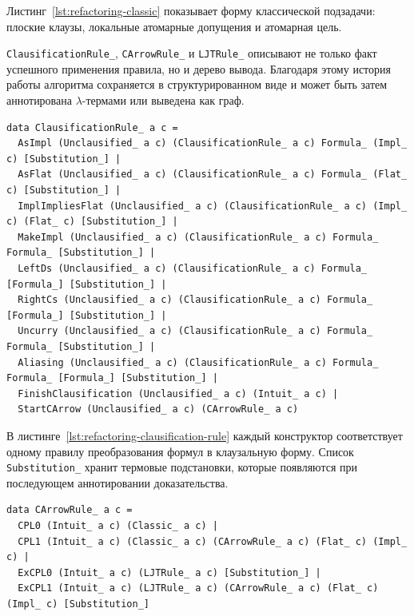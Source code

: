 \documentclass[14pt, russian]{scrartcl}
\begin{document}
Листинг~\ref{lst:refactoring-classic} показывает форму классической подзадачи:
плоские клаузы, локальные атомарные допущения и атомарная цель.

\texttt{ClausificationRule\_}, \texttt{CArrowRule\_} и \texttt{LJTRule\_}
описывают не только факт успешного применения правила, но и дерево вывода.
Благодаря этому история работы алгоритма сохраняется в структурированном виде
и может быть затем аннотирована $\lambda$-термами или выведена как граф.

\begin{listing}[!htb]
\caption{Дерево правил клаузификации \texttt{ClausificationRule\_}}
\label{lst:refactoring-clausification-rule}
\begin{verbatim}
data ClausificationRule_ a c =
  AsImpl (Unclausified_ a c) (ClausificationRule_ a c) Formula_ (Impl_ c) [Substitution_] |
  AsFlat (Unclausified_ a c) (ClausificationRule_ a c) Formula_ (Flat_ c) [Substitution_] |
  ImplImpliesFlat (Unclausified_ a c) (ClausificationRule_ a c) (Impl_ c) (Flat_ c) [Substitution_] |
  MakeImpl (Unclausified_ a c) (ClausificationRule_ a c) Formula_ Formula_ [Substitution_] |
  LeftDs (Unclausified_ a c) (ClausificationRule_ a c) Formula_ [Formula_] [Substitution_] |
  RightCs (Unclausified_ a c) (ClausificationRule_ a c) Formula_ [Formula_] [Substitution_] |
  Uncurry (Unclausified_ a c) (ClausificationRule_ a c) Formula_ Formula_ [Substitution_] |
  Aliasing (Unclausified_ a c) (ClausificationRule_ a c) Formula_ Formula_ [Formula_] [Substitution_] |
  FinishClausification (Unclausified_ a c) (Intuit_ a c) |
  StartCArrow (Unclausified_ a c) (CArrowRule_ a c)
\end{verbatim}
\end{listing}

В листинге~\ref{lst:refactoring-clausification-rule} каждый конструктор
соответствует одному правилу преобразования формул в клаузальную форму. Список
\texttt{Substitution\_} хранит термовые подстановки, которые появляются при
последующем аннотировании доказательства.

\begin{listing}[!htb]
\caption{Дерево правил $C^{\rightarrow}$ \texttt{CArrowRule\_}}
\label{lst:refactoring-carrow-rule}
\begin{verbatim}
data CArrowRule_ a c =
  CPL0 (Intuit_ a c) (Classic_ a c) |
  CPL1 (Intuit_ a c) (Classic_ a c) (CArrowRule_ a c) (Flat_ c) (Impl_ c) |
  ExCPL0 (Intuit_ a c) (LJTRule_ a c) [Substitution_] |
  ExCPL1 (Intuit_ a c) (LJTRule_ a c) (CArrowRule_ a c) (Flat_ c) (Impl_ c) [Substitution_]
\end{verbatim}
\end{listing}
\end{document}
